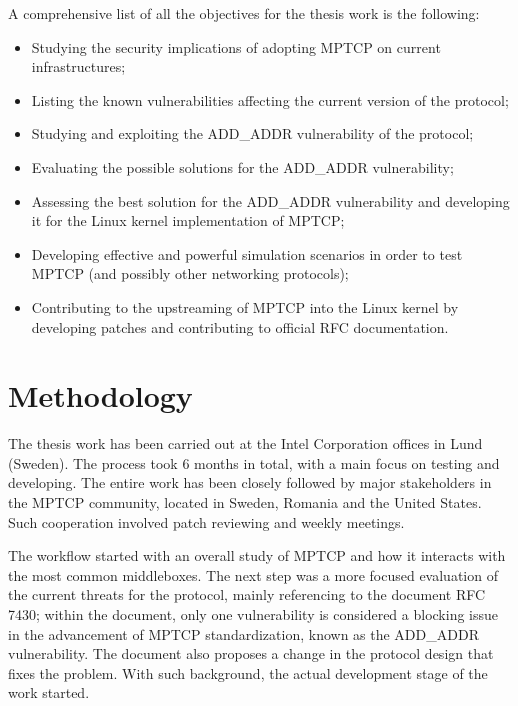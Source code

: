 A comprehensive list of all the objectives for the thesis work is the following:
\begin{itemize}
    \item Studying the security implications of adopting MPTCP on current infrastructures; 
    \item Listing the known vulnerabilities affecting the current version of the protocol; 
    \item Studying and exploiting the ADD\_ADDR vulnerability of the protocol;
    \item Evaluating the possible solutions for the ADD\_ADDR vulnerability; 
    \item Assessing the best solution for the ADD\_ADDR vulnerability and developing it for the Linux kernel implementation of MPTCP;
    \item Developing effective and powerful simulation scenarios in order to test MPTCP (and possibly other networking protocols);
    \item Contributing to the upstreaming of MPTCP into the Linux kernel by developing patches and contributing to official RFC documentation.
\end{itemize}

\section{Methodology}
The thesis work has been carried out at the Intel Corporation offices in Lund (Sweden). The process took 6 months in total, with a main focus on testing and developing. The entire work has been closely followed by major stakeholders in the MPTCP community, located in Sweden, Romania and the United States. Such cooperation involved patch reviewing and weekly meetings.


The workflow started with an overall study of MPTCP and how it interacts with the most common middleboxes. The next step was a more focused evaluation of the current threats for the protocol, mainly referencing to the document RFC 7430; within the document, only one vulnerability is considered a blocking issue in the advancement of MPTCP standardization, known as the ADD\_ADDR vulnerability. The document also proposes a change in the protocol design that fixes the problem. With such background, the actual development stage of the work started.

